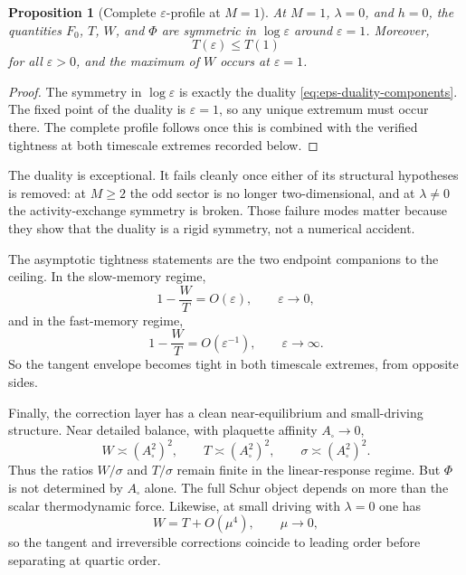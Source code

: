 \documentclass[11pt]{article}
\numberwithin{equation}{section}
\newcommand{\eps}{\varepsilon}
\theoremstyle{thmcompact}
\newtheorem{proposition}[theorem]{Proposition}
\theoremstyle{remark}
\begin{document}
\begin{proposition}[Complete $\eps$-profile at $M=1$]\label{prop:eps-profile-M1}
At $M=1$, $\lambda=0$, and $h=0$, the quantities $F_0$, $T$, $W$, and $\Phi$ are symmetric in $\log\eps$ around $\eps=1$. Moreover,
\begin{equation}\label{eq:T-peak-eps1}
T(\eps)\le T(1)
\end{equation}
for all $\eps>0$, and the maximum of $W$ occurs at $\eps=1$.
\end{proposition}

\begin{proof}
The symmetry in $\log\eps$ is exactly the duality \eqref{eq:eps-duality-components}. The fixed point of the duality is $\eps=1$, so any unique extremum must occur there. The complete profile follows once this is combined with the verified tightness at both timescale extremes recorded below.
\end{proof}

The duality is exceptional. It fails cleanly once either of its structural hypotheses is removed: at $M\ge 2$ the odd sector is no longer two-dimensional, and at $\lambda\neq0$ the activity-exchange symmetry is broken. Those failure modes matter because they show that the duality is a rigid symmetry, not a numerical accident.

The asymptotic tightness statements are the two endpoint companions to the ceiling. In the slow-memory regime,
\begin{equation}\label{eq:slow-memory-tightness}
1-\frac{W}{T}=O(\eps),
\qquad \eps\to 0,
\end{equation}
and in the fast-memory regime,
\begin{equation}\label{eq:fast-memory-tightness}
1-\frac{W}{T}=O(\eps^{-1}),
\qquad \eps\to \infty.
\end{equation}
So the tangent envelope becomes tight in both timescale extremes, from opposite sides.

Finally, the correction layer has a clean near-equilibrium and small-driving structure. Near detailed balance, with plaquette affinity $A_\square\to 0$,
\begin{equation}\label{eq:near-equilibrium-scaling}
W\asymp (A_\square^2)^2,
\qquad
T\asymp (A_\square^2)^2,
\qquad
\sigma\asymp (A_\square^2)^2.
\end{equation}
Thus the ratios $W/\sigma$ and $T/\sigma$ remain finite in the linear-response regime. But $\Phi$ is not determined by $A_\square$ alone. The full Schur object depends on more than the scalar thermodynamic force. Likewise, at small driving with $\lambda=0$ one has
\begin{equation}\label{eq:small-mu-symmetry}
W=T+O(\mu^4),
\qquad \mu\to 0,
\end{equation}
so the tangent and irreversible corrections coincide to leading order before separating at quartic order.
\end{document}
